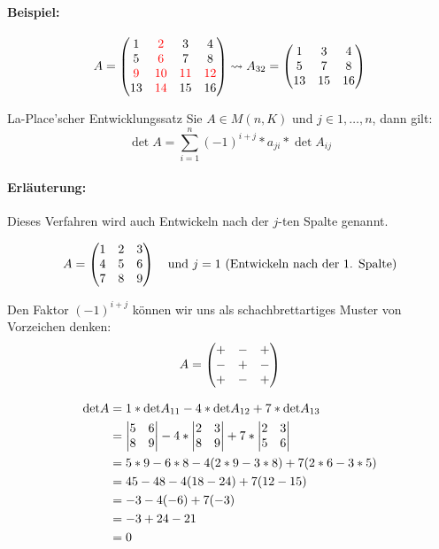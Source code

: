 \paragraph{Beispiel:}
\begin{equation*}
	A=\matrix{1&\color{red}2&3&4\\5&\color{red}6&7&8\\\color{red}9&\color{red}10&\color{red}11&\color{red}12\\13&\color{red}14&15&16}
	\rightsquigarrow A_{32}=\matrix{1&3&4\\5&7&8\\13&15&16}
\end{equation*}

\begin{satz}{La-Place'scher Entwicklungssatz}
	Sie $A\in M(n,K)$ und $j\in{1,\ldots, n}$, dann gilt:
	\begin{equation*}
		\det A=\sum\limits_{i=1}^n(-1)^{i+j}*a_{ji}*\det{A_{ij}}
	\end{equation*}
\end{satz}
\paragraph{Erläuterung:}
Dieses Verfahren wird auch Entwickeln nach der $j$-ten Spalte genannt.

\begin{equation*}
	A=\matrix{1&2&3\\4&5&6\\7&8&9}\quad\text{und }j=1 \text{ (Entwickeln nach der 1. Spalte)}
\end{equation*}

Den Faktor $(-1)^{i+j}$ können wir uns als schachbrettartiges Muster von Vorzeichen denken:
\begin{equation*}
	A=\matrix{+&-&+\\-&+&-\\+&-&+}
\end{equation*}

\begin{align*}
	\det A 	&= 1*\det A_{11}-4*\det A_{12}+7*\det A_{13}\\
					&= \detmatrix{5&6\\8&9}-4*\detmatrix{2&3\\8&9}+7*\detmatrix{2&3\\5&6}\\
					&= 5*9-6*8-4(2*9-3*8)+7(2*6-3*5)\\
					&= 45-48-4(18-24)+7(12-15)\\
					&= -3-4(-6)+7(-3)\\
					&= -3+24-21\\
					&= 0
\end{align*}
